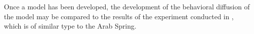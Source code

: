 Once a model has been developed, the development of the behavioral diffusion of
the model may be compared to the results of the experiment conducted in
\cite{centola2010spread}, which is of similar type to the Arab Spring.


